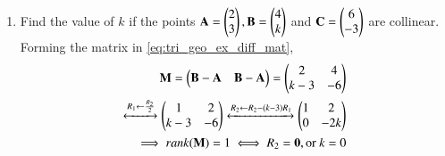 \begin{enumerate}[label=\arabic*.,ref=\thesubsection.\theenumi]
\item Find the value of $k$ if the points $\mathbf{A}=\begin{pmatrix}2\\3\end{pmatrix}, \mathbf{B}=\begin{pmatrix}4\\k\end{pmatrix}$ and $\mathbf{C}=\begin{pmatrix}6\\-3\end{pmatrix}$ are collinear.
\\
\solution Forming the matrix in \eqref{eq:tri_geo_ex_diff_mat},
\begin{align}
\mathbf{M} = \begin{pmatrix}\mathbf{B}-\mathbf{A} & \mathbf{B}-\mathbf{A}\end{pmatrix} 
= \begin{pmatrix}2 & 4\\k-3 & -6\end{pmatrix}&
\\
\xleftrightarrow {R_1\leftarrow \frac{R_2}{2}}\begin{pmatrix}1 & 2\\k-3 & -6\end{pmatrix}
\xleftrightarrow {R_2\leftarrow R_2-\ensuremath{\left(k-3\right)}R_1}\begin{pmatrix}1 & 2\\0 & -2k\end{pmatrix}&
\\
\implies rank(\mathbf{M})= 1 \iff R_2 = \mathbf{0}, \text{or }k = 0 &
\end{align}


\end{enumerate}
